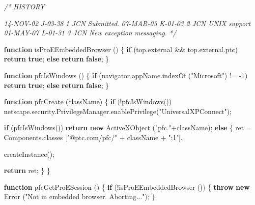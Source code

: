\documentclass[]{article}
\newenvironment{Shaded}{}{}
\newcommand{\KeywordTok}[1]{\textcolor[rgb]{0.00,0.44,0.13}{\textbf{{#1}}}}
\newcommand{\DecValTok}[1]{\textcolor[rgb]{0.25,0.63,0.44}{{#1}}}
\newcommand{\StringTok}[1]{\textcolor[rgb]{0.25,0.44,0.63}{{#1}}}
\newcommand{\CommentTok}[1]{\textcolor[rgb]{0.38,0.63,0.69}{\textit{{#1}}}}
\newcommand{\OtherTok}[1]{\textcolor[rgb]{0.00,0.44,0.13}{{#1}}}
\newcommand{\FunctionTok}[1]{\textcolor[rgb]{0.02,0.16,0.49}{{#1}}}
\newcommand{\NormalTok}[1]{{#1}}
\begin{document}
\begin{Shaded}
\begin{Highlighting}[]
\CommentTok{/*}
\CommentTok{   HISTORY}

\CommentTok{14-NOV-02   J-03-38   $$1   JCN      Submitted.}
\CommentTok{07-MAR-03   K-01-03   $$2   JCN      UNIX support}
\CommentTok{01-MAY-07   L-01-31   $$3   JCN      New exception messaging.}
\CommentTok{ */}

\KeywordTok{function} \FunctionTok{isProEEmbeddedBrowser} \NormalTok{()}
\NormalTok{\{}
  \KeywordTok{if} \NormalTok{(}\OtherTok{top}\NormalTok{.}\FunctionTok{external} \NormalTok{&& }\OtherTok{top}\NormalTok{.}\OtherTok{external}\NormalTok{.}\FunctionTok{ptc}\NormalTok{)}
    \KeywordTok{return} \KeywordTok{true}\NormalTok{;}
  \KeywordTok{else}
    \KeywordTok{return} \KeywordTok{false}\NormalTok{;}
\NormalTok{\}}

\KeywordTok{function} \FunctionTok{pfcIsWindows} \NormalTok{()}
\NormalTok{\{}
  \KeywordTok{if} \NormalTok{(}\OtherTok{navigator}\NormalTok{.}\OtherTok{appName}\NormalTok{.}\FunctionTok{indexOf} \NormalTok{(}\StringTok{"Microsoft"}\NormalTok{) != -}\DecValTok{1}\NormalTok{)}
    \KeywordTok{return} \KeywordTok{true}\NormalTok{;}
  \KeywordTok{else}
    \KeywordTok{return} \KeywordTok{false}\NormalTok{;}
\NormalTok{\}}

\KeywordTok{function} \FunctionTok{pfcCreate} \NormalTok{(className)}
\NormalTok{\{}
  \KeywordTok{if} \NormalTok{(!}\FunctionTok{pfcIsWindows}\NormalTok{())  }
    \OtherTok{netscape}\NormalTok{.}\OtherTok{security}\NormalTok{.}\OtherTok{PrivilegeManager}\NormalTok{.}\FunctionTok{enablePrivilege}\NormalTok{(}\StringTok{"UniversalXPConnect"}\NormalTok{);}
  
  \KeywordTok{if} \NormalTok{(}\FunctionTok{pfcIsWindows}\NormalTok{())}
    \KeywordTok{return} \KeywordTok{new} \FunctionTok{ActiveXObject} \NormalTok{(}\StringTok{"pfc."}\NormalTok{+className);}
  \KeywordTok{else}
    \NormalTok{\{}
      \NormalTok{ret = }\OtherTok{Components}\NormalTok{.}\FunctionTok{classes} \NormalTok{[}\StringTok{"@ptc.com/pfc/"} \NormalTok{+ className + }\StringTok{";1"}\NormalTok{].}
    
    \FunctionTok{createInstance}\NormalTok{();}
      
      \KeywordTok{return} \NormalTok{ret;}
    \NormalTok{\}}
\NormalTok{\}}

\KeywordTok{function} \FunctionTok{pfcGetProESession} \NormalTok{()}
\NormalTok{\{}
  \KeywordTok{if} \NormalTok{(!}\FunctionTok{isProEEmbeddedBrowser} \NormalTok{())}
    \NormalTok{\{}
      \KeywordTok{throw} \KeywordTok{new} \FunctionTok{Error} \NormalTok{(}\StringTok{"Not in embedded browser.  Aborting..."}\NormalTok{);}
    \NormalTok{\}}
  

\end{Highlighting}
\end{Shaded}
\end{document}
